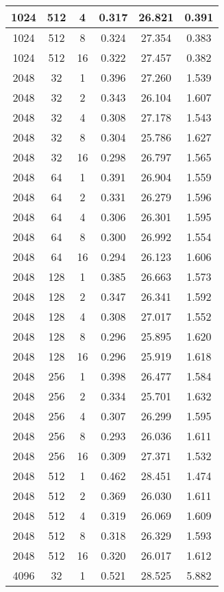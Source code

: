 \begin{longtable}{|c|c|c|c|c|c|}
\hline
1024 & 512 & 4 & 0.317 & 26.821 & 0.391 \\
\hline
1024 & 512 & 8 & 0.324 & 27.354 & 0.383 \\
\hline
1024 & 512 & 16 & 0.322 & 27.457 & 0.382 \\
\hline
2048 & 32 & 1 & 0.396 & 27.260 & 1.539 \\
\hline
2048 & 32 & 2 & 0.343 & 26.104 & 1.607 \\
\hline
2048 & 32 & 4 & 0.308 & 27.178 & 1.543 \\
\hline
2048 & 32 & 8 & 0.304 & 25.786 & 1.627 \\
\hline
2048 & 32 & 16 & 0.298 & 26.797 & 1.565 \\
\hline
2048 & 64 & 1 & 0.391 & 26.904 & 1.559 \\
\hline
2048 & 64 & 2 & 0.331 & 26.279 & 1.596 \\
\hline
2048 & 64 & 4 & 0.306 & 26.301 & 1.595 \\
\hline
2048 & 64 & 8 & 0.300 & 26.992 & 1.554 \\
\hline
2048 & 64 & 16 & 0.294 & 26.123 & 1.606 \\
\hline
2048 & 128 & 1 & 0.385 & 26.663 & 1.573 \\
\hline
2048 & 128 & 2 & 0.347 & 26.341 & 1.592 \\
\hline
2048 & 128 & 4 & 0.308 & 27.017 & 1.552 \\
\hline
2048 & 128 & 8 & 0.296 & 25.895 & 1.620 \\
\hline
2048 & 128 & 16 & 0.296 & 25.919 & 1.618 \\
\hline
2048 & 256 & 1 & 0.398 & 26.477 & 1.584 \\
\hline
2048 & 256 & 2 & 0.334 & 25.701 & 1.632 \\
\hline
2048 & 256 & 4 & 0.307 & 26.299 & 1.595 \\
\hline
2048 & 256 & 8 & 0.293 & 26.036 & 1.611 \\
\hline
2048 & 256 & 16 & 0.309 & 27.371 & 1.532 \\
\hline
2048 & 512 & 1 & 0.462 & 28.451 & 1.474 \\
\hline
2048 & 512 & 2 & 0.369 & 26.030 & 1.611 \\
\hline
2048 & 512 & 4 & 0.319 & 26.069 & 1.609 \\
\hline
2048 & 512 & 8 & 0.318 & 26.329 & 1.593 \\
\hline
2048 & 512 & 16 & 0.320 & 26.017 & 1.612 \\
\hline
4096 & 32 & 1 & 0.521 & 28.525 & 5.882 \\

\end{longtable}
